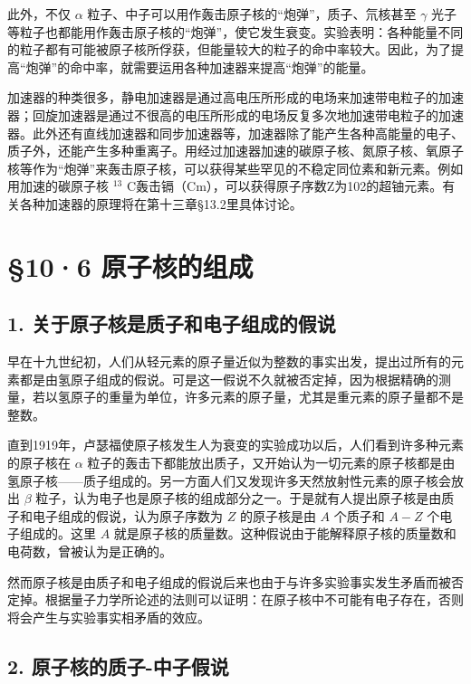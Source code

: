 此外，不仅 \(\alpha\)
粒子、中子可以用作轰击原子核的``炮弹''，质子、氘核甚至 \(\gamma\)
光子等粒子也都能用作轰击原子核的``炮弹''，使它发生衰变。实验表明：各种能量不同的粒子都有可能被原子核所俘获，但能量较大的粒子的命中率较大。因此，为了提高``炮弹''的命中率，就需要运用各种加速器来提高``炮弹''的能量。

加速器的种类很多，静电加速器是通过高电压所形成的电场来加速带电粒子的加速器；回旋加速器是通过不很高的电压所形成的电场反复多次地加速带电粒子的加速器。此外还有直线加速器和同步加速器等，加速器除了能产生各种高能量的电子、质子外，还能产生多种重离子。用经过加速器加速的碳原子核、氮原子核、氧原子核等作为``炮弹''来轰击原子核，可以获得某些罕见的不稳定同位素和新元素。例如用加速的碳原子核
\(^{13}\)
C轰击镉（Cm），可以获得原子序数Z为102的超铀元素。有关各种加速器的原理将在第十三章§13.2里具体讨论。

\section{§10·6 原子核的组成}

\subsection{1.
关于原子核是质子和电子组成的假说}

早在十九世纪初，人们从轻元素的原子量近似为整数的事实出发，提出过所有的元素都是由氢原子组成的假说。可是这一假说不久就被否定掉，因为根据精确的测量，若以氢原子的重量为单位，许多元素的原子量，尤其是重元素的原子量都不是整数。

直到1919年，卢瑟福使原子核发生人为衰变的实验成功以后，人们看到许多种元素的原子核在
\(\alpha\)
粒子的轰击下都能放出质子，又开始认为一切元素的原子核都是由氢原子核------质子组成的。另一方面人们又发现许多天然放射性元素的原子核会放出
\(\beta\)
粒子，认为电子也是原子核的组成部分之一。于是就有人提出原子核是由质子和电子组成的假说，认为原子序数为
\(Z\) 的原子核是由 \(A\) 个质子和 \(A - Z\) 个电子组成的。这里 \(A\)
就是原子核的质量数。这种假说由于能解释原子核的质量数和电荷数，曾被认为是正确的。

然而原子核是由质子和电子组成的假说后来也由于与许多实验事实发生矛盾而被否定掉。根据量子力学所论述的法则可以证明：在原子核中不可能有电子存在，否则将会产生与实验事实相矛盾的效应。

\subsection{2.
原子核的质子-中子假说}

